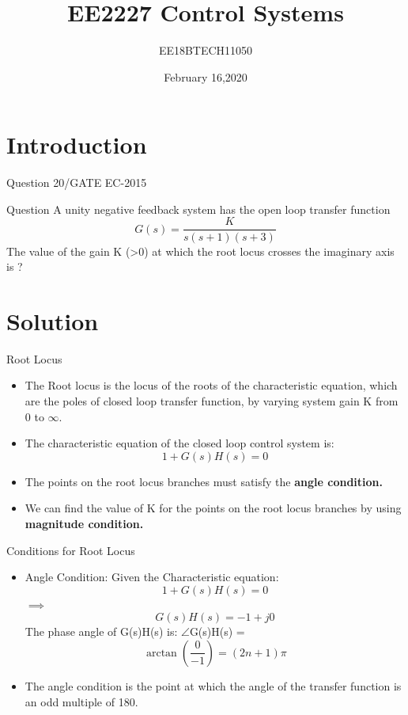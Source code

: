\documentclass{beamer}
\title[Your Short Title]{EE2227 Control Systems}
\author{EE18BTECH11050}
\institute{Krati Arela}
\date{February 16,2020}
\begin{document}
\begin{frame}
  \titlepage
\end{frame}

\section{Introduction}

\begin{frame}{Question 20/GATE EC-2015}


\begin{block}{Question}
A unity negative feedback system has the open loop transfer function\newline
\[G(s) = \frac{K}{s(s+1)(s+3)}\]\newline
The value of the gain K (>0) at which the root locus crosses the imaginary axis is ?
\end{block}

\end{frame}

\section{Solution}

\begin{frame}{Root Locus}
\begin{itemize}
\item The Root locus is the locus of the roots of the characteristic equation, which are the poles of closed loop transfer function, by varying system gain K from $0$ to $\infty$.

\item The characteristic equation of the closed loop control system is: 
\[1 + G(s)H(s) = 0\]
\item The points on the root locus branches must satisfy the \textbf{angle condition.}
\item We can find the value of K for the points on the root locus branches by using \textbf{magnitude condition.}
\end{itemize}
\end{frame}

\begin{frame}{Conditions for Root Locus}

\begin{itemize}
    \item Angle Condition:
    Given the Characteristic equation:
    \[1+G(s)H(s) = 0\]
    $\implies$\[G(s)H(s) = -1 + j0\]
    The phase angle of G(s)H(s) is:
    $\angle$G(s)H(s) =\[ \arctan(\frac{0}{-1}) = (2n+1)\pi\]
    \item The angle condition is the point at which the angle of the transfer function is an odd multiple of 180.
\end{itemize}

\end{frame}
\end{document}
